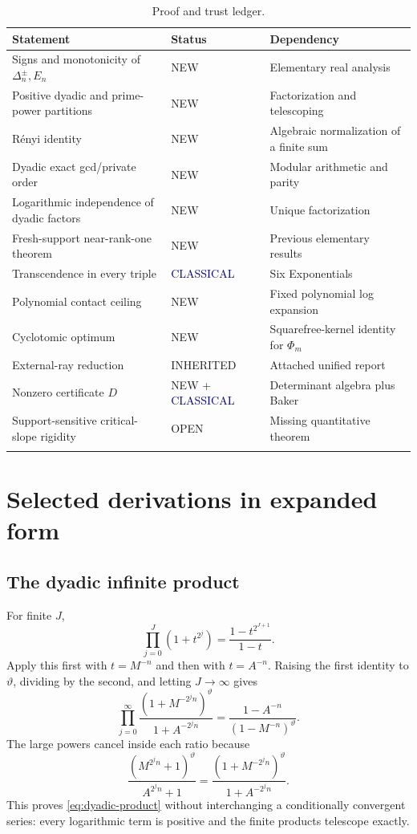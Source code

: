 \documentclass[11pt]{article}
\theoremstyle{definition}
\newcommand{\vtheta}{\vartheta}
\newcommand{\newtag}{\textcolor{newgreen}{\textsf{NEW}}}
\newcommand{\inheritedtag}{\textcolor{bluegray}{\textsf{INHERITED}}}
\newcommand{\classtag}{\textcolor{navy}{\textsf{CLASSICAL}}}
\newcommand{\opentag}{\textcolor{openorange}{\textsf{OPEN}}}
\begin{document}
\begin{longtable}{@{}p{}p{}p{}@{}}
\toprule
Statement & Status & Dependency \\
\midrule
\endhead
Signs and monotonicity of $\Delta_n^\pm,E_n$ & \newtag{} & Elementary real analysis \\
Positive dyadic and prime-power partitions & \newtag{} & Factorization and telescoping \\
R\'enyi identity & \newtag{} & Algebraic normalization of a finite sum \\
Dyadic exact gcd/private order & \newtag{} & Modular arithmetic and parity \\
Logarithmic independence of dyadic factors & \newtag{} & Unique factorization \\
Fresh-support near-rank-one theorem & \newtag{} & Previous elementary results \\
Transcendence in every triple & \classtag{} & Six Exponentials \\
Polynomial contact ceiling & \newtag{} & Fixed polynomial log expansion \\
Cyclotomic optimum & \newtag{} & Squarefree-kernel identity for $\Phi_m$ \\
External-ray reduction & \inheritedtag{} & Attached unified report \\
Nonzero certificate $D$ & \newtag{} + \classtag{} & Determinant algebra plus Baker \\
Support-sensitive critical-slope rigidity & \opentag{} & Missing quantitative theorem \\
\bottomrule
\caption{Proof and trust ledger.}
\end{longtable}

\section{Selected derivations in expanded form}\label{app:derivations}

\subsection{The dyadic infinite product}

For finite $J$,
\[
 \prod_{j=0}^{J}(1+t^{2^j})=\frac{1-t^{2^{J+1}}}{1-t}.
\]
Apply this first with $t=M^{-n}$ and then with $t=A^{-n}$.  Raising the first identity to
$\vtheta$, dividing by the second, and letting $J\to\infty$ gives
\[
 \prod_{j=0}^{\infty}
 \frac{(1+M^{-2^jn})^{\vtheta}}{1+A^{-2^jn}}
 =\frac{1-A^{-n}}{(1-M^{-n})^{\vtheta}}.
\]
The large powers cancel inside each ratio because
\[
 \frac{(M^{2^jn}+1)^{\vtheta}}{A^{2^jn}+1}
 =\frac{(1+M^{-2^jn})^{\vtheta}}{1+A^{-2^jn}}.
\]
This proves \eqref{eq:dyadic-product} without interchanging a conditionally convergent
series: every logarithmic term is positive and the finite products telescope exactly.
\end{document}
